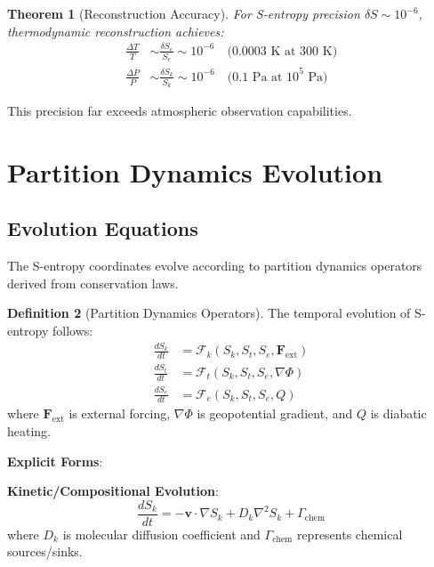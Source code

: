 \documentclass[twocolumn,10pt,a4paper]{article}
\newtheorem{theorem}{Theorem}[section]
\theoremstyle{definition}
\newtheorem{definition}[theorem]{Definition}
\theoremstyle{remark}
\begin{document}
\begin{theorem}[Reconstruction Accuracy]
\label{thm:recon_accuracy}
For S-entropy precision $\delta S \sim 10^{-6}$, thermodynamic reconstruction achieves:
\begin{align}
    \frac{\Delta T}{T} &\sim \frac{\delta S_e}{S_e} \sim 10^{-6} \quad \text{(0.0003 K at 300 K)} \\
    \frac{\Delta P}{P} &\sim \frac{\delta S_k}{S_k} \sim 10^{-6} \quad \text{(0.1 Pa at 10}^5 \text{ Pa)}
\end{align}
\end{theorem}

This precision far exceeds atmospheric observation capabilities.

\section{Partition Dynamics Evolution}
\label{sec:evolution}

\subsection{Evolution Equations}

The S-entropy coordinates evolve according to partition dynamics operators derived from conservation laws.

\begin{definition}[Partition Dynamics Operators]
\label{def:partition_ops}
The temporal evolution of S-entropy follows:
\begin{align}
    \frac{dS_k}{dt} &= \mathcal{F}_k(S_k, S_t, S_e, \mathbf{F}_{\text{ext}}) \\
    \frac{dS_t}{dt} &= \mathcal{F}_t(S_k, S_t, S_e, \nabla\Phi) \\
    \frac{dS_e}{dt} &= \mathcal{F}_e(S_k, S_t, S_e, Q)
\end{align}
where $\mathbf{F}_{\text{ext}}$ is external forcing, $\nabla\Phi$ is geopotential gradient, and $Q$ is diabatic heating.
\end{definition}

\textbf{Explicit Forms}:

\textbf{Kinetic/Compositional Evolution}:
\begin{equation}
    \frac{dS_k}{dt} = -\mathbf{v} \cdot \nabla S_k + D_k \nabla^2 S_k + \Gamma_{\text{chem}}
\end{equation}
where $D_k$ is molecular diffusion coefficient and $\Gamma_{\text{chem}}$ represents chemical sources/sinks.
\end{document}
